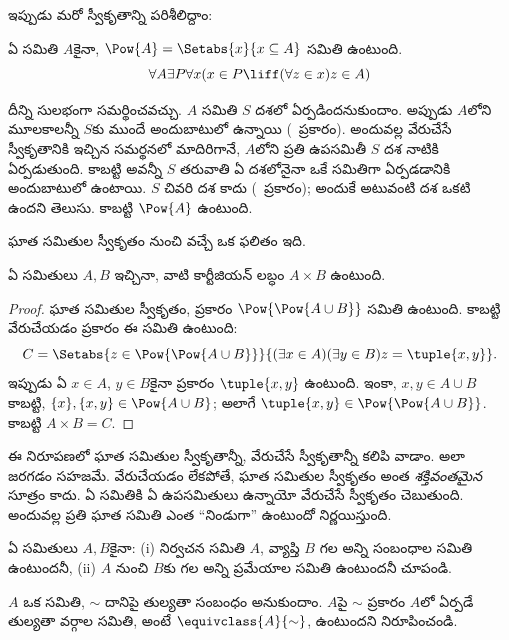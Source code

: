 \documentclass[../../../include/open-logic-section]{subfiles}
\begin{document}

ఇప్పుడు మరో స్వీకృతాన్ని
పరిశీలిద్దాం:

\begin{axiom}[ఘాత సమితులు]
ఏ సమితి $A$కైనా,
$\Pow{A} = \Setabs{x}{x \subseteq A}$ సమితి ఉంటుంది.
\[
	\forall A \exists P \forall x(x \in P \liff (\forall z \in x)z \in A)
\]
\end{axiom}

దీన్ని సులభంగా
సమర్థించవచ్చు. $A$ సమితి $S$
దశలో ఏర్పడిందనుకుందాం.
అప్పుడు $A$లోని మూలకాలన్నీ
$S$కు ముందే అందుబాటులో
ఉన్నాయి (\stagesacc\ ప్రకారం).
అందువల్ల వేరుచేసే స్వీకృతానికి ఇచ్చిన
సమర్థనలో మాదిరిగానే, $A$లోని
ప్రతి ఉపసమితీ $S$ దశ నాటికి ఏర్పడుతుంది.
కాబట్టి అవన్నీ $S$
తరువాతి ఏ దశలోనైనా
ఒకే సమితిగా ఏర్పడడానికి అందుబాటులో ఉంటాయి.
$S$ చివరి దశ కాదు
(\stagessucc\ ప్రకారం);
అందుకే అటువంటి దశ
ఒకటి ఉందని తెలుసు.
కాబట్టి $\Pow{A}$ ఉంటుంది.

ఘాత సమితుల స్వీకృతం నుంచి వచ్చే
ఒక ఫలితం ఇది.

\begin{prop}\label{thm:Products}
ఏ సమితులు $A, B$ ఇచ్చినా,
వాటి కార్టీజియన్ లబ్ధం
$A \times B$ ఉంటుంది.
\end{prop}

\begin{proof}
ఘాత సమితుల స్వీకృతం,
ప్రకారం $\Pow{\Pow{A \cup B}}$
సమితి ఉంటుంది. కాబట్టి
వేరుచేయడం ప్రకారం ఈ
సమితి ఉంటుంది:
\[
	C = \Setabs{z \in \Pow{\Pow{A \cup B}}}{(\exists x \in A)(\exists y \in B) z = \tuple{x, y}}.
\]
ఇప్పుడు ఏ $x \in A$,
$y \in B$కైనా
ప్రకారం $\tuple{x, y}$
ఉంటుంది. ఇంకా, $x, y
\in A \cup B$ కాబట్టి,
$\{x\}, \{x, y\} \in \Pow{A \cup B}$;
అలాగే $\tuple{x,y} \in \Pow{\Pow{A \cup B}}$.
కాబట్టి $A \times B = C$.
\end{proof}

ఈ నిరూపణలో ఘాత సమితుల స్వీకృతాన్నీ,
వేరుచేసే స్వీకృతాన్నీ కలిపి వాడాం.
అలా జరగడం సహజమే.
వేరుచేయడం లేకపోతే,
ఘాత సమితుల స్వీకృతం
అంత \emph{శక్తివంతమైన}
సూత్రం కాదు. ఏ సమితికి
ఏ ఉపసమితులు ఉన్నాయో
వేరుచేసే స్వీకృతం చెబుతుంది.
అందువల్ల ప్రతి ఘాత
సమితి ఎంత ``నిండుగా''
ఉంటుందో నిర్ణయిస్తుంది.

\begin{prob}
ఏ సమితులు $A, B$కైనా:
(i) నిర్వచన సమితి $A$,
వ్యాప్తి $B$ గల
అన్ని సంబంధాల సమితి
ఉంటుందనీ, (ii) $A$
నుంచి $B$కు గల
అన్ని ప్రమేయాల సమితి
ఉంటుందనీ చూపండి.
\end{prob}

\begin{prob}
$A$ ఒక సమితి, $\sim$
దానిపై తుల్యతా సంబంధం
అనుకుందాం. $A$పై $\sim$
ప్రకారం $A$లో ఏర్పడే తుల్యతా వర్గాల
సమితి, అంటే
$\equivclass{A}{\sim}$,
ఉంటుందని నిరూపించండి.
\end{prob}
\end{document}

